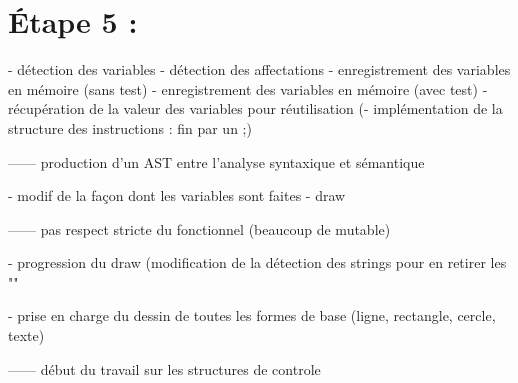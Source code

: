\documentclass[a4paper, 12pt]{report}
\begin{document}
\chapter{\'Etape 5 : }

    - détection des variables
    	- détection des affectations
        - enregistrement des variables en mémoire (sans test)
        - enregistrement des variables en mémoire (avec test)
        - récupération de la valeur des variables pour réutilisation
      (- implémentation de la structure des instructions : fin par un ;)
    
    
   																			 	------ production d'un AST entre l'analyse syntaxique et sémantique
    
    - modif de la façon dont les variables sont faites
    - draw
    
    																			------ pas respect stricte du fonctionnel (beaucoup de mutable)
    
    - progression du draw (modification de la détection des strings pour en retirer les ""
    
    - prise en charge du dessin de toutes les formes de base (ligne, rectangle, cercle, texte)
    
    																			------ début du travail sur les structures de controle
    
\end{document}

